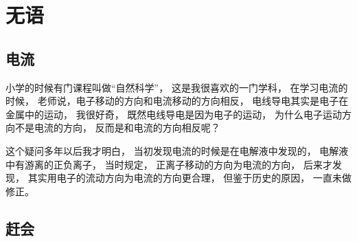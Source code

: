 
\chapter{无语}

\section{电流}

小学的时候有门课程叫做“自然科学”，
这是我很喜欢的一门学科，
在学习电流的时候，
老师说，电子移动的方向和电流移动的方向相反，
电线导电其实是电子在金属中的运动，
我很好奇，
既然电线导电是因为电子的运动，
为什么电子运动方向不是电流的方向，
反而是和电流的方向相反呢？

这个疑问多年以后我才明白，
当初发现电流的时候是在电解液中发现的，
电解液中有游离的正负离子，
当时规定，
正离子移动的方向为电流的方向，
后来才发现，
其实用电子的流动方向为电流的方向更合理，
但鉴于历史的原因，
一直未做修正。


\section{赶会}

